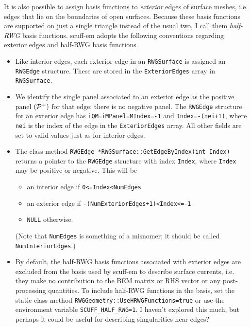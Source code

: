 It is also possible to assign basis functions to 
\textit{exterior} edges of surface meshes, i.e.
edges that lie on the boundaries of open surfaces.
Because these basis functions are supported on just
a single triangle instead of the usual two,
I call them \textit{half-RWG} basis functions.
{\sc scuff-em} adopts the following conventions
regarding exterior edges and half-RWG basis functions.

\begin{itemize}
  \item Like interior edges, each exterior edge in an \texttt{RWGSurface} is
        assigned an \texttt{RWGEdge} structure. These are stored in the
        \texttt{ExteriorEdges} array in \texttt{RWGSurface}.

  \item We identify the single panel associated to an exterior edge
        as the positive panel $(\mathcal{P}^+)$ for that edge; there is no 
        negative panel.
        The \texttt{RWGEdge} structure for an exterior edge has
        \texttt{iQM=iMPanel=MIndex=-1} and \texttt{Index=-(nei+1)},
        where \texttt{nei} is the index of the edge in the \texttt{ExteriorEdges}
        array.
        All other fields are set to valid values just as for interior edges.

  \item The class method \texttt{RWGEdge *RWGSurface::GetEdgeByIndex(int Index)}
        returns a pointer to the \texttt{RWGEdge} structure with index \texttt{Index},
        where \texttt{Index} may be positive or negative.
        This will be 
        \begin{itemize}
          \item an interior edge if \texttt{0<=Index<NumEdges}
          \item an exterior edge if \texttt{-(NumExteriorEdges+1)<Index<=-1}
          \item \texttt{NULL} otherwise.
        \end{itemize}
        (Note that \texttt{NumEdges} is something of a misnomer; it should
         be called \texttt{NumInteriorEdges}.)
 
  \item By default, the half-RWG basis functions associated with exterior edges
        are excluded from the basis used by {\sc scuff-em} to describe surface 
        currents, i.e. they make no contribution to the BEM matrix or
        RHS vector or any post-processing quantities. To include half-RWG
        functions in the basis,
        set the static class method \texttt{RWGGeometry::UseHRWGFunctions=true}
        or use the environment variable \texttt{SCUFF\_HALF\_RWG=1}.
        I haven't explored this much, but perhaps it could be useful for
        describing singularities near edges?


\end{itemize}
